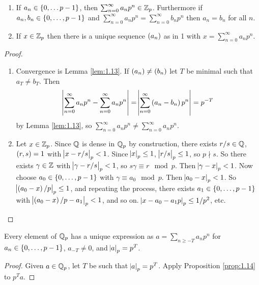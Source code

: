 \begin{proposition}
\label{prop:1.14}
\hfill
\begin{enumerate}
\item If $ a_n \in \cbr{0, \dots p - 1} $, then $ \sum_{n = 0}^\infty a_np^n \in \mathbb{Z}_p $. Furthermore if $ a_n, b_n \in \cbr{0, \dots, p - 1} $ and $ \sum_{n = 0}^\infty a_np^n = \sum_{n = 0}^\infty b_np^n $ then $ a_n = b_n $ for all $ n $.
\item If $ x \in \mathbb{Z}_p $ then there is a unique sequence $ \br{a_n} $ as in 1 with $ x = \sum_{n = 0}^\infty a_np^n $.
\end{enumerate}
\end{proposition}

\begin{proof}
\hfill
\begin{enumerate}
\item Convergence is Lemma \ref{lem:1.13}. If $ \br{a_n} \ne \br{b_n} $ let $ T $ be minimal such that $ a_T \ne b_T $. Then
$$ \abs{\sum_{n = 0}^\infty a_np^n - \sum_{n = 0}^\infty a_np^n} = \abs{\sum_{n = 0}^\infty \br{a_n - b_n}p^n} = p^{-T} $$
by Lemma \ref{lem:1.13}, so $ \sum_{n = 0}^\infty a_np^n \ne \sum_{n = 0}^\infty a_np^n $.
\item Let $ x \in \mathbb{Z}_p $. Since $ \mathbb{Q} $ is dense in $ \mathbb{Q}_p $ by construction, there exists $ r / s \in \mathbb{Q} $, $ \br{r, s} = 1 $ with $ \abs{x - r / s}_p < 1 $. Since $ \abs{x}_p \le 1 $, $ \abs{r / s}_p \le 1 $, so $ p \nmid s $. So there exists $ \gamma \in \mathbb{Z} $ with $ \abs{\gamma - r / s}_p < 1 $, so $ s\gamma \equiv r \mod p $. Then $ \abs{\gamma - x}_p < 1 $. Now choose $ a_0 \in \cbr{0, \dots, p - 1} $ with $ \gamma \equiv a_0 \mod p $. Then $ \abs{a_0 - x}_p < 1 $. So $ \abs{\br{a_0 - x} / p}_p \le 1 $, and repeating the process, there exists $ a_1 \in \cbr{0, \dots, p - 1} $ with $ \abs{\br{a_0 - x} / p - a_1}_p < 1 $, and so on. $ \abs{x - a_0 - a_1p}_p \le 1 / p^2 $, etc.
\end{enumerate}
\end{proof}


\begin{corollary}
Every element of $ \mathbb{Q}_p $ has a unique expression as $ a = \sum_{n \ge -T} a_np^n $ for $ a_n \in \cbr{0, \dots, p - 1} $, $ a_{-T} \ne 0 $, and $ \abs{a}_p = p^T $.
\end{corollary}

\begin{proof}
Given $ a \in \mathbb{Q}_p $, let $ T $ be such that $ \abs{a}_p = p^T $. Apply Proposition \ref{prop:1.14} to $ p^Ta $.
\end{proof}

